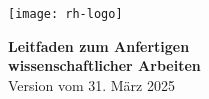 \begin{titlepage}
    \thispagestyle{empty}
    \hspace{-1cm}\texttt{[image: rh-logo]}\\[1.9cm]
    
    \vspace{2cm}
    \begin{minipage}{\textwidth}
    \hspace{2.5cm}\begin{minipage}{\dimexpr\textwidth-2.5cm\relax}
    {\Large\textbf{Leitfaden zum Anfertigen \\ wissenschaftlicher Arbeiten}}\\

    
    {\normalsize\fontsize{11pt}{16.5pt}\selectfont Version vom 31. März 2025}\\
    

    \end{minipage}
    \end{minipage}
    
    \vfill
    
\end{titlepage}